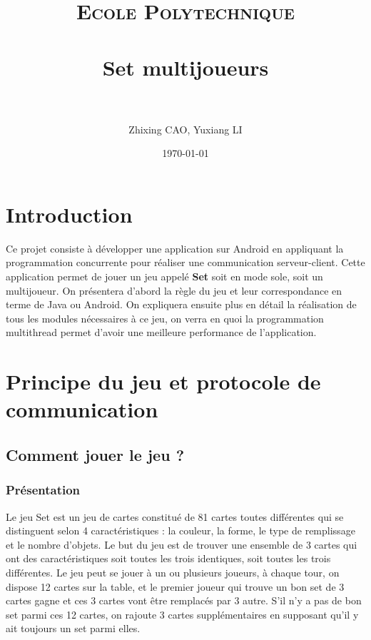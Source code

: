 \documentclass[paper=a4, french]{scrartcl} %
\title{	
\normalfont \normalsize 
\textsc{Ecole Polytechnique} \\ [25pt] %
\horrule{0.5pt} \\[0.4cm] %
\huge Set multijoueurs \\ %
\horrule{2pt} \\[0.5cm] %
}
\author{Zhixing CAO, Yuxiang LI} %
\date{\normalsize\today} %
\numberwithin{equation}{section} %
\numberwithin{figure}{section} %
\numberwithin{table}{section} %
\begin{document}
\setlength\parindent{12pt}

\maketitle %



\section{Introduction}

Ce projet consiste à développer une application sur Android en appliquant la programmation concurrente pour réaliser une communication serveur-client. Cette application permet de jouer un jeu appelé \textbf{Set} soit en mode sole, soit un multijoueur. On présentera d'abord la règle du jeu et leur correspondance en terme de Java ou Android. On expliquera ensuite plus en détail la réalisation de tous les modules nécessaires à ce jeu, on verra en quoi la programmation multithread permet d'avoir une meilleure performance de l'application.


\section{Principe du jeu et protocole de communication }

\subsection{Comment jouer le jeu ?}

\subsubsection{Présentation}
Le jeu Set est un jeu de cartes constitué de 81 cartes toutes différentes qui se distinguent selon 4 caractéristiques : la couleur, la forme, le type de remplissage et le nombre d'objets. Le but du jeu est de trouver une ensemble de 3 cartes qui ont des caractéristiques soit toutes les trois identiques, soit toutes les trois différentes. Le jeu peut se jouer à un ou plusieurs joueurs, à chaque tour, on dispose 12 cartes sur la table, et le premier joueur qui trouve un bon set de 3 cartes gagne et ces 3 cartes vont être remplacés par 3 autre. S'il n'y a pas de bon set parmi ces 12 cartes, on rajoute 3 cartes supplémentaires en supposant qu'il y ait toujours un set parmi elles.
\end{document}
